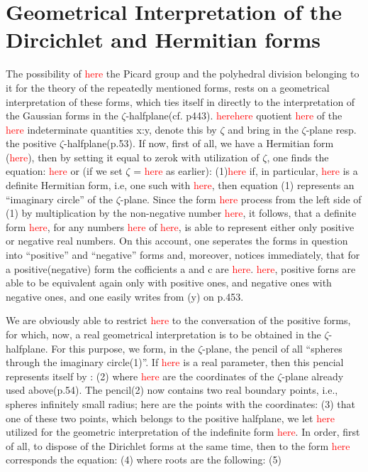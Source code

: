 \section{Geometrical Interpretation of the Dircichlet and Hermitian forms}

The possibility of \textcolor{red}{here} the Picard group and the polyhedral division belonging to it for the theory of the repeatedly mentioned forms, rests on a geometrical interpretation of these forms, which ties itself in directly to the interpretation of the Gaussian forms in the $\zeta$-halfplane(cf. p443). \textcolor{red}{here}\textcolor{red}{here} quotient \textcolor{red}{here} of the \textcolor{red}{here} indeterminate quantities x:y, denote this by $\zeta$ and bring in the $\zeta$-plane resp. the positive $\zeta$-halfplane(p.53).
If now, first of all, we have a Hermitian form (\textcolor{red}{here}), then by setting it equal to zerok with utilization of $\zeta$, one finds the equation:
\textcolor{red}{here}
or (if we set $\zeta$ = \textcolor{red}{here} as earlier):
(1)\textcolor{red}{here}
if, in particular, \textcolor{red}{here} is a definite Hermitian form, i.e, one such with \textcolor{red}{here}, then equation (1) represents an “imaginary circle” of the $\zeta$-plane. Since the form \textcolor{red}{here} process from the left side of (1) by multiplication by the non-negative number \textcolor{red}{here}, it follows, that a definite form \textcolor{red}{here}, for any  numbers \textcolor{red}{here} of \textcolor{red}{here}, is able to represent either only positive or negative real numbers. On this account, one seperates the forms in question into “positive” and “negative” forms and, moreover, notices immediately, that for a positive(negative) form the cofficients a and c are \textcolor{red}{here}. \textcolor{red}{here}, positive forns are able to be equivalent again only with positive ones, and negative ones with negative ones, and one easily writes from (y) on p.453.

We are obviously able to restrict \textcolor{red}{here} to the conversation of the positive forms, for which, now, a real geometrical interpretation is to be obtained in the $\zeta$-halfplane. For this purpose, we form, in the $\zeta$-plane, the pencil of all “spheres through the imaginary circle(1)”. If \textcolor{red}{here} is a real parameter, then this pencial represents itself by :
(2)
where \textcolor{red}{here} are the coordinates of the $\zeta$-plane already used above(p.54). The pencil(2) now contains two real boundary points, i.e., spheres infinitely small radius; here are the points with the coordinates:
(3)
that one of these two points, which belongs to the positive halfplane, we let \textcolor{red}{here} utilized for the geometric interpretation of the indefinite form \textcolor{red}{here}.
In order, first of all, to dispose of the Dirichlet forms at the same time, then to the form \textcolor{red}{here} corresponds the equation:
(4)
where roots are the following:
(5)


